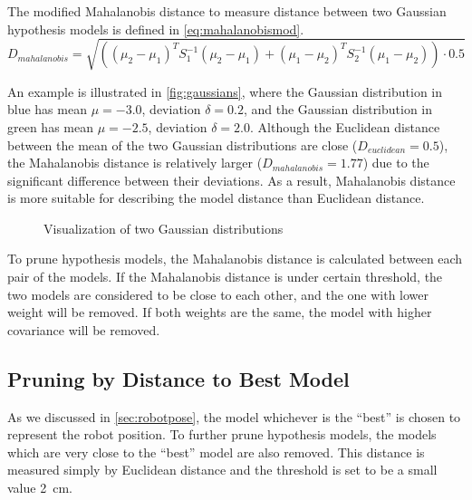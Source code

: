 The modified Mahalanobis distance to measure distance between two Gaussian hypothesis models is defined in \autoref{eq:mahalanobismod}.
\begin{equation}
\label{eq:mahalanobismod}
D_{mahalanobis} = \sqrt{((\mu_2 - \mu_1)^T S_1^{-1} (\mu_2-\mu_1) + (\mu_1 - \mu_2)^T S_2^{-1} (\mu_1-\mu_2)) \cdot 0.5}
\end{equation}

An example is illustrated in \autoref{fig:gaussians}, where the Gaussian distribution in blue has mean $\mu=-3.0$, deviation $\delta=0.2$, and the Gaussian distribution in green has mean $\mu=-2.5$, deviation $\delta=2.0$. Although the Euclidean distance between the mean of the two Gaussian distributions are close ($D_{euclidean}=0.5$), the Mahalanobis distance is relatively larger ($D_{mahalanobis}=1.77$) due to the significant difference between their deviations. As a result, Mahalanobis distance is more suitable for describing the model distance than Euclidean distance.


\begin{figure}[!htbp]
\begin{center}
  
\end{center}
\caption{Visualization of two Gaussian distributions}
\label{fig:gaussians}
\end{figure}


To prune hypothesis models, the Mahalanobis distance is calculated between each pair of the models. If the Mahalanobis distance is under certain threshold, the two models are considered to be close to each other, and the one with lower weight will be removed. If both weights are the same, the model with higher covariance will be removed.


\subsection{Pruning by Distance to Best Model}
\label{sub:Pruning by Distance to Best Model}

As we discussed in \autoref{sec:robotpose}, the model whichever is the ``best'' is chosen to represent the robot position. To further prune hypothesis models, the models which are very close to the ``best'' model are also removed. This distance is measured simply by Euclidean distance and the threshold is set to be a small value \SI{2}{\cm}.

